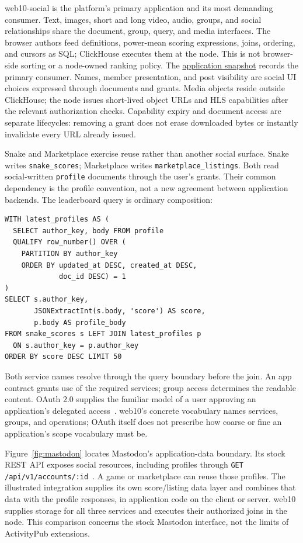 \documentclass[sigconf, nonacm]{acmart}
\newcommand{\artifactbase}{https://github.com/jacoby149/web10}
\newcommand{\artifactrev}{317fa349eae714ddde07f249ca65cdaa34b6459b}
\newcommand{\artifactdir}[2]{\href{\artifactbase/tree/\artifactrev/#1}{#2}}
\begin{document}
web10-social is the platform's primary application and its most demanding
consumer. Text, images, short and long video, audio, groups, and social
relationships share the document, group, query, and media interfaces.
The browser authors feed definitions, power-mean scoring expressions,
joins, ordering, and cursors as SQL; ClickHouse executes them at the node.
This is not browser-side sorting or a node-owned ranking policy. The
\artifactdir{marketing/web10-social/src}{application snapshot} records the
primary consumer. Names, member presentation, and post visibility are
social UI choices expressed through documents and grants. Media objects
reside outside ClickHouse; the
node issues short-lived object URLs and HLS capabilities after the
relevant authorization checks. Capability expiry and document access are
separate lifecycles: removing a grant does not erase downloaded bytes or
instantly invalidate every URL already issued.

Snake and Marketplace exercise reuse rather than another social surface.
Snake writes \texttt{snake\_scores}; Marketplace writes
\texttt{marketplace\_listings}. Both read social-written
\texttt{profile} documents through the user's grants. Their common
dependency is the profile convention, not a new agreement between
application backends. The leaderboard query is ordinary composition:
\begin{minipage}{\columnwidth}
\begin{lstlisting}[style=sql]
WITH latest_profiles AS (
  SELECT author_key, body FROM profile
  QUALIFY row_number() OVER (
    PARTITION BY author_key
    ORDER BY updated_at DESC, created_at DESC,
             doc_id DESC) = 1
)
SELECT s.author_key,
       JSONExtractInt(s.body, 'score') AS score,
       p.body AS profile_body
FROM snake_scores s LEFT JOIN latest_profiles p
  ON s.author_key = p.author_key
ORDER BY score DESC LIMIT 50
\end{lstlisting}
\end{minipage}
Both service names resolve through the query boundary before the join.
An app contract grants use of the required services; group access
determines the readable content. OAuth 2.0 supplies the familiar model
of a user approving an application's delegated access~\cite{oauth2012}.
web10's concrete vocabulary names services, groups, and operations;
OAuth itself does not prescribe how coarse or fine an application's
scope vocabulary must be.

Figure~\ref{fig:mastodon} locates Mastodon's application-data boundary.
Its stock REST API exposes social resources, including profiles
through \texttt{GET /api/v1/accounts/:id}~\cite{mastodon-rest,mastodon-accounts}.
A game or marketplace can reuse those profiles. The illustrated
integration supplies its own score/listing data layer and combines that
data with the profile responses, in application code on the client or
server. web10 supplies storage for all three services and executes their
authorized joins in the node. This comparison concerns the stock
Mastodon interface, not the limits of ActivityPub extensions.
\end{document}

